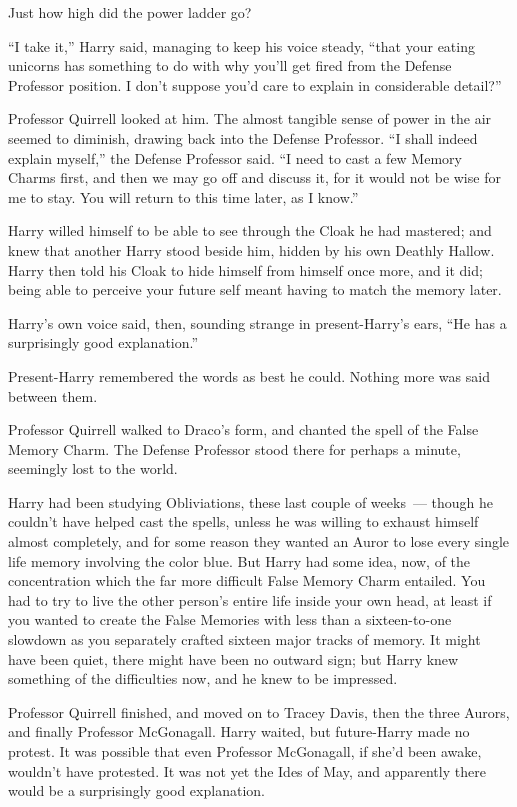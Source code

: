 Just how high did the power ladder go?

``I take it,'' Harry said, managing to keep his voice steady, ``that your eating unicorns has something to do with why you'll get fired from the Defense Professor position. I don't suppose you'd care to explain in considerable detail?''

Professor Quirrell looked at him. The almost tangible sense of power in the air seemed to diminish, drawing back into the Defense Professor. ``I shall indeed explain myself,'' the Defense Professor said. ``I need to cast a few Memory Charms first, and then we may go off and discuss it, for it would not be wise for me to stay. You will return to this time later, as I know.''

Harry willed himself to be able to see through the Cloak he had mastered; and knew that another Harry stood beside him, hidden by his own Deathly Hallow. Harry then told his Cloak to hide himself from himself once more, and it did; being able to perceive your future self meant having to match the memory later.

Harry's own voice said, then, sounding strange in present-Harry's ears, ``He has a surprisingly good explanation.''

Present-Harry remembered the words as best he could. Nothing more was said between them.

Professor Quirrell walked to Draco's form, and chanted the spell of the False Memory Charm. The Defense Professor stood there for perhaps a minute, seemingly lost to the world.

Harry had been studying Obliviations, these last couple of weeks~--- though he couldn't have helped cast the spells, unless he was willing to exhaust himself almost completely, and for some reason they wanted an Auror to lose every single life memory involving the color blue. But Harry had some idea, now, of the concentration which the far more difficult False Memory Charm entailed. You had to try to live the other person's entire life inside your own head, at least if you wanted to create the False Memories with less than a sixteen-to-one slowdown as you separately crafted sixteen major tracks of memory. It might have been quiet, there might have been no outward sign; but Harry knew something of the difficulties now, and he knew to be impressed.

Professor Quirrell finished, and moved on to Tracey Davis, then the three Aurors, and finally Professor McGonagall. Harry waited, but future-Harry made no protest. It was possible that even Professor McGonagall, if she'd been awake, wouldn't have protested. It was not yet the Ides of May, and apparently there would be a surprisingly good explanation.


